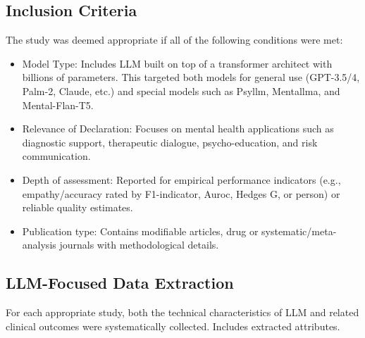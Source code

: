 \documentclass[journal]{IEEEtran}
\begin{document}
\subsection{Inclusion Criteria}
The study was deemed appropriate if all of the following conditions were met:
\begin{itemize}
    \item Model Type: Includes LLM built on top of a transformer architect with billions of parameters. This targeted both models for general use (GPT-3.5/4, Palm-2, Claude, etc.) and special models such as Psyllm, Mentallma, and Mental-Flan-T5.
    \item Relevance of Declaration: Focuses on mental health applications such as diagnostic support, therapeutic dialogue, psycho-education, and risk communication.
    \item Depth of assessment: Reported for empirical performance indicators (e.g., empathy/accuracy rated by F1-indicator, Auroc, Hedges G, or person) or reliable quality estimates.
    \item Publication type: Contains modifiable articles, drug or systematic/meta-analysis journals with methodological details.

\end{itemize}

\subsection{LLM-Focused Data Extraction}
For each appropriate study, both the technical characteristics of LLM and related clinical outcomes were systematically collected. Includes extracted attributes.
  
\end{document}
